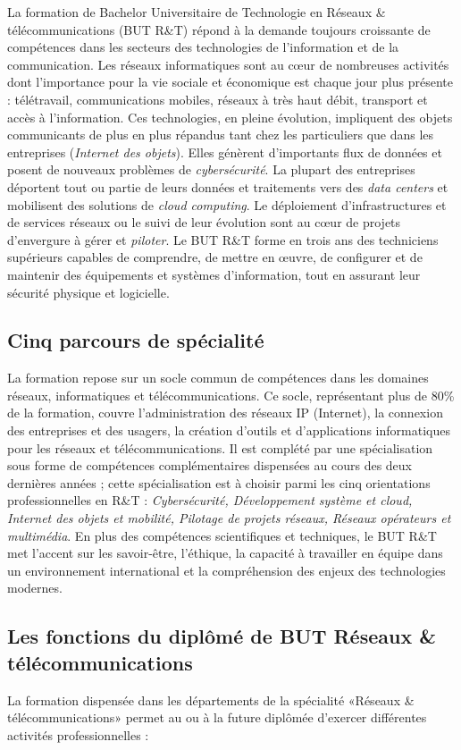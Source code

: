 La formation de Bachelor Universitaire de Technologie en Réseaux \& télécommunications  (BUT R\&T) répond à la demande toujours croissante de compétences dans les secteurs  des technologies de l'information et de la communication. Les réseaux informatiques sont au cœur de nombreuses activités dont l'importance pour la vie sociale et économique est chaque jour plus présente : télétravail, communications mobiles, réseaux à très haut débit, transport et accès à l'information. Ces technologies, en pleine évolution, impliquent des objets communicants  de plus en plus répandus tant chez les particuliers que dans les entreprises ({\em Internet des objets}). Elles génèrent d'importants flux de données et posent de nouveaux problèmes de {\em cybersécurité}. La plupart des entreprises déportent tout ou partie de leurs données et traitements vers des {\em data centers} et mobilisent des solutions de {\em cloud computing}. Le déploiement d'infrastructures et de services réseaux ou le suivi de leur évolution sont au cœur de projets d'envergure à gérer et {\em piloter}.  Le BUT R\&T forme en trois ans des techniciens supérieurs capables de comprendre, de mettre en œuvre, de  configurer et de maintenir des équipements et systèmes d'information, tout en assurant leur sécurité physique et logicielle. 

\subsection*{Cinq parcours de spécialité}
La formation repose sur un socle commun de compétences dans les domaines réseaux, informatiques et télécommunications. Ce socle, représentant plus de 80\% de la formation, couvre l'administration des réseaux IP (Internet), la connexion des entreprises et des usagers, la création d'outils et d'applications informatiques pour les réseaux et télécommunications. Il est complété par une spécialisation sous forme de compétences complémentaires dispensées au cours des deux dernières années ; cette spécialisation est à choisir parmi les cinq orientations professionnelles en R\&T : {\em Cybersécurité, Développement système et cloud, Internet des objets et mobilité, Pilotage de projets réseaux, Réseaux opérateurs et multimédia}. En plus des compétences scientifiques et techniques, le BUT R\&T met l'accent sur les savoir-être, l'éthique, la capacité à travailler en équipe dans un environnement international et la compréhension des enjeux des technologies modernes.

\subsection*{Les fonctions du diplômé de BUT Réseaux \& télécommunications}
La formation dispensée dans les départements de la spécialité «Réseaux \& télécommunications» permet au ou à la future diplômée d'exercer différentes activités professionnelles :

